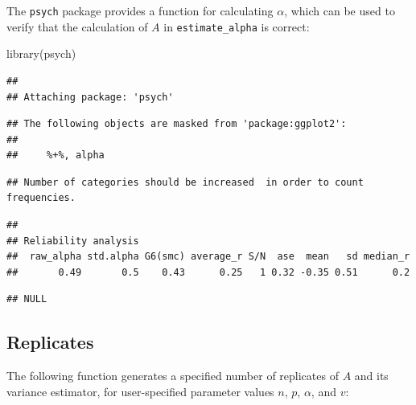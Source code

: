 \documentclass[
]{book}
\newenvironment{Shaded}{\begin{snugshade}}{\end{snugshade}}
\newcommand{\AttributeTok}[1]{\textcolor[rgb]{0.77,0.63,0.00}{#1}}
\newcommand{\FunctionTok}[1]{\textcolor[rgb]{0.00,0.00,0.00}{#1}}
\newcommand{\NormalTok}[1]{#1}
\newcommand{\SpecialCharTok}[1]{\textcolor[rgb]{0.00,0.00,0.00}{#1}}
\begin{document}
The \texttt{psych} package provides a function for calculating \(\alpha\), which can be used to verify that the calculation of \(A\) in \texttt{estimate\_alpha} is correct:

\begin{Shaded}
\begin{Highlighting}[]
\FunctionTok{library}\NormalTok{(psych)}
\end{Highlighting}
\end{Shaded}

\begin{verbatim}
## 
## Attaching package: 'psych'
\end{verbatim}

\begin{verbatim}
## The following objects are masked from 'package:ggplot2':
## 
##     %+%, alpha
\end{verbatim}

\begin{Shaded}
\end{Shaded}

\begin{verbatim}
## Number of categories should be increased  in order to count frequencies.
\end{verbatim}

\begin{verbatim}
## 
## Reliability analysis   
##  raw_alpha std.alpha G6(smc) average_r S/N  ase  mean   sd median_r
##       0.49       0.5    0.43      0.25   1 0.32 -0.35 0.51      0.2
\end{verbatim}

\begin{verbatim}
## NULL
\end{verbatim}

\hypertarget{replicates}{%
\subsection{Replicates}\label{replicates}}

The following function generates a specified number of replicates of \(A\) and its variance estimator, for user-specified parameter values \(n\), \(p\), \(\alpha\), and \(v\):
\end{document}
